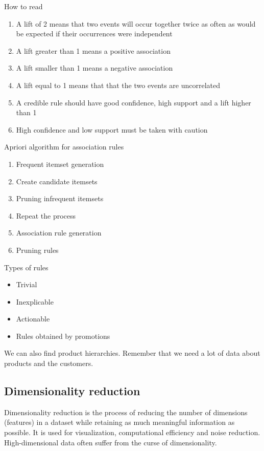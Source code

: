 How to read 

\begin{enumerate}
    \item A lift of 2 means that two events will occur together twice as often as would be expected if their occurrences were independent
    \item A lift greater than 1 means a positive association
    \item A lift smaller than 1 means a negative association
    \item A lift equal to 1 means that that the two events are uncorrelated
    \item A credible rule should have good confidence, high support and a lift higher than 1
    \item High confidence and low support must be taken with caution
\end{enumerate}


\vspace{10pt}

Apriori algorithm for association rules

\begin{enumerate}
    \item Frequent itemset generation
    \item Create candidate itemsets
    \item Pruning infrequent itemsets
    \item Repeat the process
    \item Association rule generation
    \item Pruning rules
\end{enumerate}

\vspace{10pt}

Types of rules

\begin{itemize}
    \item Trivial 
    \item Inexplicable
    \item Actionable
    \item Rules obtained by promotions
\end{itemize}

We can also find product hierarchies. Remember that we need a lot of data about products and the customers.



\subsection{Dimensionality reduction}
Dimensionality reduction is the process of reducing the number of dimensions (features) in a dataset while retaining as much meaningful information as possible. It is used for visualization, computational efficiency and noise reduction. High-dimensional data often suffer from the curse of dimensionality.

